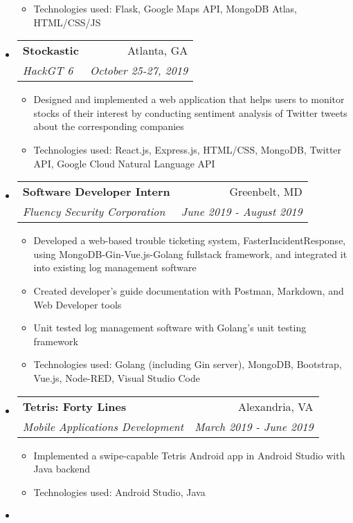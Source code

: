 \documentclass[letterpaper,11pt]{article}
\makeatletter
\newcommand{\resitem}[1]{\item #1 \vspace{-2pt}}
\newcommand{\ressubheading}[4]{
\begin{tabular*}{7.0in}{l@{\extracolsep{\fill}}r}
		\textbf{#1} & #2 \\
		\textit{#3} & \textit{#4} \\
\end{tabular*}\vspace{-6pt}}
\makeatother
\begin{document}
\begin{itemize}
\begin{itemize}
        \item Technologies used: Flask, Google Maps API, MongoDB Atlas, HTML/CSS/JS
    \end{itemize}
\item
    \ressubheading{Stockastic}{Atlanta, GA}{HackGT 6}{October 25-27, 2019}
    \begin{itemize}
        \item Designed and implemented a web application that helps users to monitor stocks of their interest by conducting sentiment analysis of Twitter tweets about the corresponding companies
        \item Technologies used: React.js, Express.js, HTML/CSS, MongoDB,  Twitter API, Google Cloud Natural Language API
    \end{itemize}
\item
    \ressubheading{Software Developer Intern}{Greenbelt, MD}{Fluency Security Corporation}{June 2019 - August 2019}
	\begin{itemize}
	    \resitem{Developed a web-based trouble ticketing system, FasterIncidentResponse, using MongoDB-Gin-Vue.js-Golang fullstack framework, and integrated it into existing log management software}
		\resitem{Created developer's guide documentation with Postman, Markdown, and Web Developer tools}
		\resitem{Unit tested log management software with Golang's unit testing framework}
		\resitem{Technologies used: Golang (including Gin server), MongoDB, Bootstrap, Vue.js, Node-RED, Visual Studio Code}
	\end{itemize}
\item
    \ressubheading{Tetris: Forty Lines}{Alexandria, VA}{Mobile Applications Development}{March 2019 - June 2019}
	\begin{itemize}
		\resitem{Implemented a swipe-capable Tetris Android app in Android Studio with Java backend}
		\resitem{Technologies used: Android Studio, Java}
	\end{itemize}
\item

\end{itemize}
\end{document}
